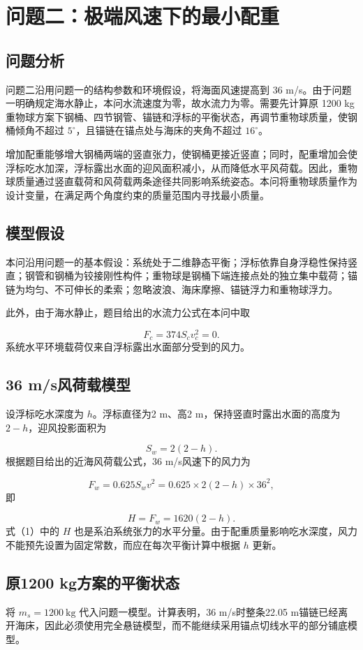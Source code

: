 \section{问题二：极端风速下的最小配重}
\subsection{问题分析}
问题二沿用问题一的结构参数和环境假设，将海面风速提高到 36 m/s。由于问题一明确规定海水静止，本问水流速度为零，故水流力为零。需要先计算原 1200 kg 重物球方案下钢桶、四节钢管、锚链和浮标的平衡状态，再调节重物球质量，使钢桶倾角不超过 \(5^\circ\)，且锚链在锚点处与海床的夹角不超过 \(16^\circ\)。

增加配重能够增大钢桶两端的竖直张力，使钢桶更接近竖直；同时，配重增加会使浮标吃水加深，浮标露出水面的迎风面积减小，从而降低水平风荷载。因此，重物球质量通过竖直载荷和风荷载两条途径共同影响系统姿态。本问将重物球质量作为设计变量，在满足两个角度约束的质量范围内寻找最小质量。

\subsection{模型假设}
本问沿用问题一的基本假设：系统处于二维静态平衡；浮标依靠自身浮稳性保持竖直；钢管和钢桶为铰接刚性构件；重物球是钢桶下端连接点处的独立集中载荷；锚链为均匀、不可伸长的柔索；忽略波浪、海床摩擦、锚链浮力和重物球浮力。

此外，由于海水静止，题目给出的水流力公式在本问中取

\[
F_c=374S_cv_c^2=0.
\]
系统水平环境载荷仅来自浮标露出水面部分受到的风力。

\subsection{36 m/s风荷载模型}
设浮标吃水深度为 \(h\)。浮标直径为2 m、高2 m，保持竖直时露出水面的高度为 \(2-h\)，迎风投影面积为

\[
S_w=2(2-h).
\]
根据题目给出的近海风荷载公式，36 m/s风速下的风力为

\[
F_w=0.625S_wv^2
=0.625\times2(2-h)\times36^2,
\]
即

\[
H=F_w=1620(2-h). \tag{1}
\]
式（1）中的 \(H\) 也是系泊系统张力的水平分量。由于配重质量影响吃水深度，风力不能预先设置为固定常数，而应在每次平衡计算中根据 \(h\) 更新。

\subsection{原1200 kg方案的平衡状态}
将 \(m_s=1200\ \mathrm{kg}\) 代入问题一模型。计算表明，36 m/s时整条22.05 m锚链已经离开海床，因此必须使用完全悬链模型，而不能继续采用锚点切线水平的部分铺底模型。

